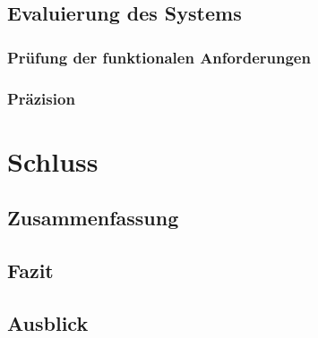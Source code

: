 \section{Evaluierung des Systems}
\subsection{Prüfung der funktionalen Anforderungen}
\subsection{Präzision}


\chapter{Schluss}
\section{Zusammenfassung}
\section{Fazit}
\section{Ausblick}
